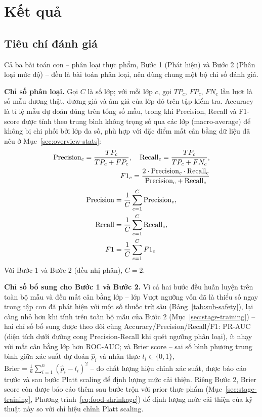\documentclass[10pt,twocolumn,twoside]{article}
\begin{document}
\section{Kết quả}
\label{sec:results}

\subsection{Tiêu chí đánh giá}
\label{sec:metrics}

Cả ba bài toán con -- phân loại thực phẩm, Bước 1 (Phát hiện) và Bước 2
(Phân loại mức độ) -- đều là bài toán phân loại, nên dùng chung một bộ chỉ
số đánh giá.

\textbf{Chỉ số phân loại.} Gọi $C$ là số lớp; với mỗi lớp $c$, gọi $TP_c$,
$FP_c$, $FN_c$ lần lượt là số mẫu dương thật, dương giả và âm giả của lớp đó
trên tập kiểm tra. Accuracy là tỉ lệ mẫu dự đoán đúng trên tổng số mẫu,
trong khi Precision, Recall và F1-score được tính theo trung bình không
trọng số qua các lớp (macro-average) để không bị chi phối bởi lớp đa số,
phù hợp với đặc điểm mất cân bằng dữ liệu đã nêu ở
Mục~\ref{sec:overview-stats}:
\begin{align}
\mathrm{Precision}_c = \frac{TP_c}{TP_c + FP_c}, \quad
\mathrm{Recall}_c = \frac{TP_c}{TP_c + FN_c}, \notag\\
F1_c = \frac{2 \cdot \mathrm{Precision}_c \cdot \mathrm{Recall}_c}{\mathrm{Precision}_c + \mathrm{Recall}_c}
\label{eq:prf1}
\end{align}
\begin{align}
\mathrm{Precision} &= \frac{1}{C}\sum_{c=1}^{C}\mathrm{Precision}_c, \notag\\
\mathrm{Recall} &= \frac{1}{C}\sum_{c=1}^{C}\mathrm{Recall}_c, \notag\\
F1 &= \frac{1}{C}\sum_{c=1}^{C}F1_c
\label{eq:macro}
\end{align}
Với Bước 1 và Bước 2 (đều nhị phân), $C=2$.

\textbf{Chỉ số bổ sung cho Bước 1 và Bước 2.} Vì cả hai bước đều huấn luyện
trên toàn bộ mẫu và đều mất cân bằng lớp -- lớp Vượt ngưỡng vốn đã là thiểu
số ngay trong tập con đã phát hiện với một số thuốc trừ sâu
(Bảng~\ref{tab:sub-safety}), lại càng nhỏ hơn khi tính trên toàn bộ mẫu của
Bước 2 (Mục~\ref{sec:stage-training}) -- hai chỉ số bổ sung được theo dõi
cùng Accuracy/Precision/Recall/F1: PR-AUC (diện tích dưới
đường cong Precision-Recall khi quét ngưỡng phân loại), ít nhạy với mất cân
bằng lớp hơn ROC-AUC; và Brier score -- sai số bình phương trung bình giữa
xác suất dự đoán $\hat{p}_i$ và nhãn thực $l_i \in \{0,1\}$,
$\mathrm{Brier} = \frac{1}{n}\sum_{i=1}^{n}(\hat{p}_i - l_i)^2$ -- đo chất
lượng hiệu chỉnh xác suất, được báo cáo trước và sau bước Platt scaling để
định lượng mức cải thiện. Riêng Bước 2, Brier score còn được báo cáo thêm
sau bước trộn với prior thực phẩm (Mục~\ref{sec:stage-training}, Phương
trình~\ref{eq:food-shrinkage}) để định lượng mức cải thiện của kỹ thuật
này so với chỉ hiệu chỉnh Platt scaling.
\end{document}
